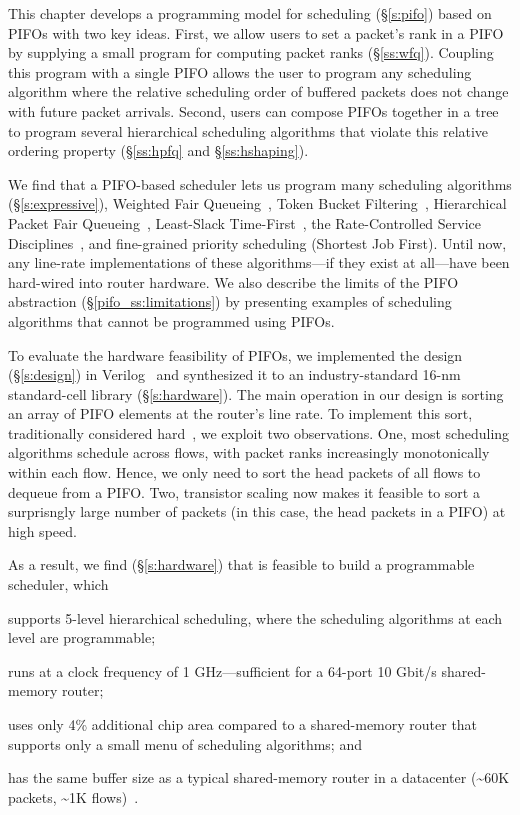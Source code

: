 This chapter develops a programming model for scheduling (\S\ref{s:pifo}) based
on PIFOs with two key ideas. First, we allow users to set a packet's rank in a
PIFO by supplying a small program for computing packet ranks (\S\ref{ss:wfq}).
Coupling this program with a single PIFO allows the user to program any
scheduling algorithm where the relative scheduling order of buffered packets
does not change with future packet arrivals. Second, users can compose PIFOs
together in a tree to program several hierarchical scheduling algorithms that
violate this relative ordering property (\S\ref{ss:hpfq} and
\S\ref{ss:hshaping}).

We find that a PIFO-based scheduler lets us program many scheduling algorithms
(\S\ref{s:expressive}), \eg Weighted Fair Queueing~\cite{wfq}, Token Bucket
Filtering~\cite{tbf}, Hierarchical Packet Fair Queueing~\cite{hpfq},
Least-Slack Time-First~\cite{lstf}, the Rate-Controlled Service
Disciplines~\cite{rcsd}, and fine-grained priority scheduling (\eg Shortest Job
First). Until now, any line-rate implementations of these algorithms---if they
exist at all---have been hard-wired into router hardware. We also describe the
limits of the PIFO abstraction (\S\ref{pifo_ss:limitations}) by presenting
examples of scheduling algorithms that cannot be programmed using PIFOs.

To evaluate the hardware feasibility of PIFOs, we implemented the design
(\S\ref{s:design}) in Verilog~\cite{system_verilog} and synthesized it to an
industry-standard 16-nm standard-cell library (\S\ref{s:hardware}). The main
operation in our design is sorting an array of PIFO elements at the router's
line rate. To implement this sort, traditionally considered hard~\cite{sfq,
drr}, we exploit two observations. One, most scheduling algorithms schedule
across flows, with packet ranks increasingly monotonically within each flow.
Hence, we only need to sort the head packets of all flows to dequeue from a
PIFO.  Two, transistor scaling now makes it feasible to sort a surprisngly
large number of packets (in this case, the head packets in a PIFO) at high
speed.

As a result, we find (\S\ref{s:hardware}) that is feasible to build a
programmable scheduler, which
\begin{CompactItemize}
  \item supports 5-level hierarchical scheduling, where the scheduling
    algorithms at each level are programmable;
  \item runs at a clock frequency of 1 GHz---sufficient for a 64-port
    10 Gbit/s shared-memory router;
  \item uses only 4\% additional chip area compared to a
    shared-memory router that supports only a small menu of scheduling
    algorithms; and
  \item has the same buffer size as a typical shared-memory router
    in a datacenter (\textasciitilde 60K packets, \textasciitilde 1K flows)~\cite{trident2}.
\end{CompactItemize}

